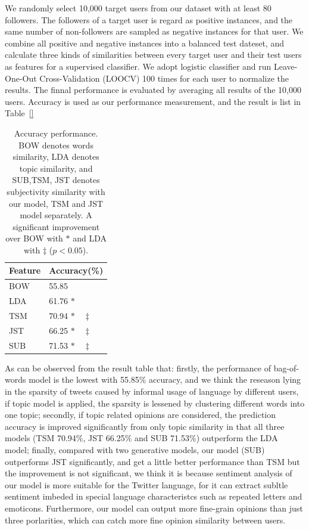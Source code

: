 \documentclass[runningheads,a4paper]{llncs}
\begin{document}
We randomly select 10,000 target users from our dataset with at least 80 followers. The followers of a target user is regard as positive instances, and the same number of non-followers are sampled as negative instances for that user. We combine all positive and negative instances into a balanced test dateset, and calculate three kinds of similarities between every target user and their test users as features for a supervised classifier. We adopt logistic classifier and run Leave-One-Out Cross-Validation (LOOCV) 100 times for each user to normalize the results. The finnal performance is evaluated by averaging all results of the 10,000 users. Accuracy is used as our performance measurement, and the result is list in Table~\ref{}
\begin{table}[htb]
\centering
\caption{Accuracy performance. BOW denotes words similarity, LDA denotes topic similarity, and SUB,TSM, JST denotes subjectivity similarity with our model, TSM and JST model separately. A significant improvement over BOW with $ \ast $ and LDA with $ \ddagger $ ($p < 0.05$).}
\label{tab3}
\begin{tabular}{|l|l|}
\hline
Feature & Accuracy(\%)\\
\hline
BOW & 55.85  \\
LDA & 61.76 $ \ast  $\\
TSM & 70.94  $ \ast \quad \ddagger $\\
JST & 66.25 $ \ast \quad \ddagger $\\
SUB & 71.53 $ \ast \quad \ddagger $\\
\hline
\end{tabular}
\end{table}
As can be observed from the result table that: firstly, the performance of bag-of-words model is the lowest with 55.85\% accuracy, and we think the reseason lying in the sparsity of tweets caused by informal usage of language by different users, if topic model is applied, the sparsity is lessened by clustering different words into one topic; secondly, if topic related opinions are considered, the prediction accuracy is improved significantly from only topic similarity in that all three models (TSM 70.94\%, JST 66.25\% and SUB 71.53\%) outperform the LDA model; finally, compared with two generative models, our model (SUB) outperforms JST significantly, and get a little better performance than TSM but the improvement is not significant, we think it is because sentiment analysis of our model is more suitable for the Twitter language, for it can extract subltle sentiment imbeded in special language characteristcs such as repeated letters and emoticons. Furthermore, our model can output more fine-grain opinions than just three porlarities, which can catch more fine opinion similarity between users.
\end{document}

